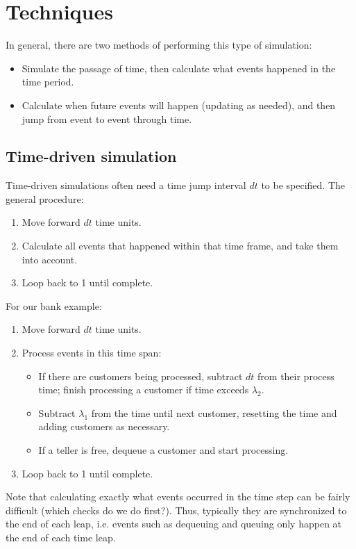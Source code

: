 \documentclass{article}
\begin{document}
\section{Techniques}
In general, there are two methods of performing this type of simulation:
\begin{itemize}
\item Simulate the passage of time, then calculate what events happened in the time period.
\item Calculate when future events will happen (updating as needed), and then jump from event to event through time.
\end{itemize}

\subsection{Time-driven simulation}
Time-driven simulations often need a time jump interval $dt$ to be specified.  The general procedure:

\begin{enumerate}
\item Move forward $dt$ time units.
\item Calculate all events that happened within that time frame, and take them into account.
\item Loop back to 1 until complete.
\end{enumerate}
For our bank example:
\begin{enumerate}
\item Move forward $dt$ time units.
\item Process events in this time span:
\begin{itemize}
\item If there are customers being processed, subtract $dt$ from their process time; finish processing a customer if time exceeds $\lambda_2$.
\item Subtract $\lambda_1$ from the time until next customer, resetting the time and adding customers as necessary.
\item If a teller is free, dequeue a customer and start processing.
\end{itemize}
\item Loop back to 1 until complete.
\end{enumerate}

Note that calculating exactly what events occurred in the time step can be fairly difficult (which checks do we do first?).  Thus, typically they are synchronized to the end of each leap, i.e. events such as dequeuing and queuing only happen at the end of each time leap.
\end{document}
